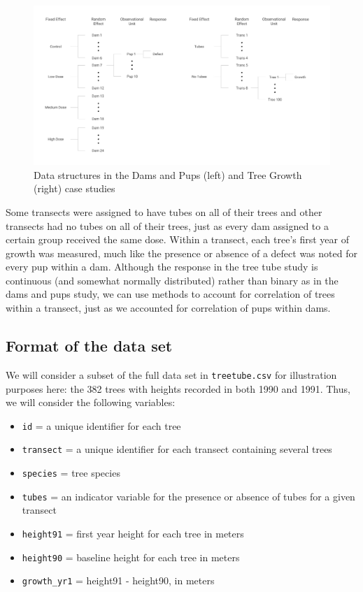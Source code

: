 \documentclass[
]{krantz}
\providecommand{\tightlist}{%
  \setlength{\itemsep}{0pt}\setlength{\parskip}{0pt}}
\begin{document}
\begin{figure}
\centering
\includegraphics{data/DamsTreesStructure.png}
\caption{Data structures in the Dams and Pups (left) and Tree Growth (right) case studies}
\end{figure}

Some transects were assigned to have tubes on all of their trees and other transects had no tubes on all of their trees, just as every dam assigned to a certain group received the same dose. Within a transect, each tree's first year of growth was measured, much like the presence or absence of a defect was noted for every pup within a dam. Although the response in the tree tube study is continuous (and somewhat normally distributed) rather than binary as in the dams and pups study, we can use methods to account for correlation of trees within a transect, just as we accounted for correlation of pups within dams.

\hypertarget{format-of-the-data-set}{%
\subsection{Format of the data set}\label{format-of-the-data-set}}

We will consider a subset of the full data set in \texttt{treetube.csv} for illustration purposes here: the 382 trees with heights recorded in both 1990 and 1991. Thus, we will consider the following variables:

\begin{itemize}
\tightlist
\item
  \texttt{id} = a unique identifier for each tree
\item
  \texttt{transect} = a unique identifier for each transect containing several trees
\item
  \texttt{species} = tree species
\item
  \texttt{tubes} = an indicator variable for the presence or absence of tubes for a given transect
\item
  \texttt{height91} = first year height for each tree in meters
\item
  \texttt{height90} = baseline height for each tree in meters
\item
  \texttt{growth\_yr1} = height91 - height90, in meters
\end{itemize}
\end{document}
